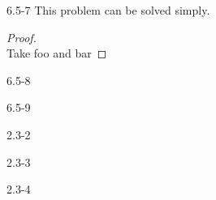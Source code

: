 





\homeworkheader{\classnameandsection}


\begin{problem}{6.5-7}
  This problem can be solved simply.
  \begin{proof}\ \\

    \noindent Take foo and bar
  \end{proof}
\end{problem}
\begin{problem}{6.5-8}
\end{problem}
\begin{problem}{6.5-9}
\end{problem}
\begin{problem}{2.3-2}
\end{problem}
\begin{problem}{2.3-3}
\end{problem}
\begin{problem}{2.3-4}
\end{problem}


